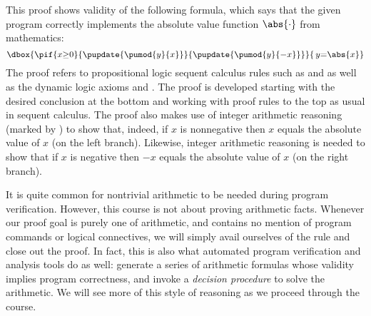 \documentclass[11pt,twoside]{scrartcl}
\begin{document}
This proof shows validity of the following formula, which says that the given program correctly implements the absolute value function \(\abs{\cdot}\) from mathematics:
\[{\dbox{\pif{x{\geq}0}{\pupdate{\pumod{y}{x}}}{\pupdate{\pumod{y}{-x}}}}{\,y{=}\abs{x}}}\]
The proof refers to propositional logic sequent calculus rules such as  and  as well as the dynamic logic axioms  and .
The proof is developed starting with the desired conclusion at the bottom and working with proof rules to the top as usual in sequent calculus.
The proof also makes use of integer arithmetic reasoning (marked by ) to show that, indeed, if $x$ is nonnegative then $x$ equals the absolute value of $x$ (on the left branch).
Likewise, integer arithmetic reasoning is needed to show that if $x$ is negative then $-x$ equals the absolute value of $x$ (on the right branch).

It is quite common for nontrivial arithmetic to be needed during program verification. However, this course is not about proving arithmetic facts. Whenever our proof goal is purely one of arithmetic, and contains no mention of program commands or logical connectives, we will simply avail ourselves of the  rule and close out the proof. In fact, this is also what automated program verification and analysis tools do as well: generate a series of arithmetic formulas whose validity implies program correctness, and invoke a \emph{decision procedure} to solve the arithmetic. We will see more of this style of reasoning as we proceed through the course.
\end{document}
